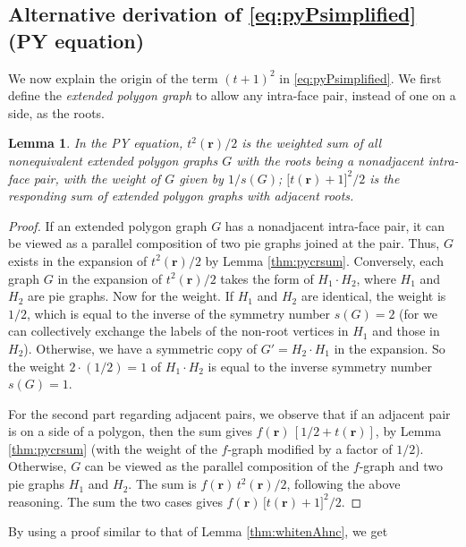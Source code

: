 \documentclass[preprint]{revtex4-1}
\newtheorem{lemm}[thrm]{Lemma}
\newcommand{\vct}[1]{\mathbf{#1}}
\providecommand{\vr}{} %
\renewcommand{\vr}{\vct{r}}
\begin{document}
\subsection{\label{sec:pyPalt}
Alternative derivation of \eqref{eq:pyPsimplified} (PY equation)}


We now explain the origin of the term $(t+1)^2$ in \eqref{eq:pyPsimplified}.
%
We first define the \emph{extended polygon graph}
to allow any intra-face pair, instead of one on a side,
as the roots.


\begin{lemm}
In the PY equation,
$t^2(\vr)/2$
is the weighted sum of all nonequivalent extended polygon graphs $G$
with the roots being a nonadjacent intra-face pair,
with the weight of $G$ given by $1/s(G)$;
$\bigl[ t(\vr) + 1 \bigr]^2/2$
is the responding sum of extended polygon graphs
with adjacent roots.
\end{lemm}

\begin{proof}
If an extended polygon graph $G$ has a nonadjacent intra-face pair,
  it can be viewed as a parallel composition
  of two pie graphs joined at the pair.
%
Thus, $G$ exists in the expansion of $t^2(\vr)/2$
  by Lemma \ref{thm:pycrsum}.
%
Conversely,
  each graph $G$ in the expansion of $t^2(\vr)/2$
  takes the form of $H_1 \cdot H_2$,
  where $H_1$ and $H_2$ are pie graphs.
%
Now for the weight.
%
If $H_1$ and $H_2$ are identical,
  the weight is $1/2$,
  which is equal to the inverse of
  the symmetry number $s(G) = 2$
  (for we can collectively exchange
  the labels of the non-root vertices in $H_1$
  and those in $H_2$).
%
Otherwise,
  we have a symmetric copy of $G' = H_2 \cdot H_1$
  in the expansion.
So the weight $2\cdot(1/2) = 1$ of $H_1 \cdot H_2$
  is equal to the inverse symmetry number $s(G) = 1$.

For the second part regarding adjacent pairs,
  we observe that
  if an adjacent pair is on a side of a polygon,
  then the sum gives $f(\vr) \, [1/2 + t(\vr)]$,
  by Lemma \ref{thm:pycrsum}
  (with the weight of the $f$-graph
  modified by a factor of $1/2$).
%
Otherwise,
  $G$ can be viewed as the parallel composition
  of the $f$-graph and two pie graphs $H_1$ and $H_2$.
%
The sum is $f(\vr) \, t^2(\vr)/2$,
  following the above reasoning.
%
The sum the two cases gives
  $f(\vr) \, \bigl[ t(\vr) + 1 \bigr]^2/2$.
\end{proof}



By using a proof similar to that of
Lemma \ref{thm:whitenAhnc},
we get
\end{document}
